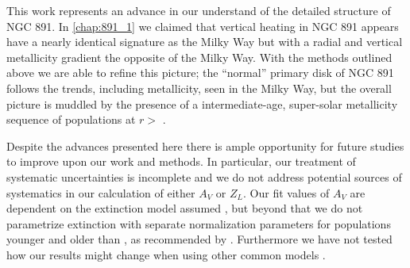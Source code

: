 
This work represents an advance in our understand of the detailed
structure of NGC 891. In \ref{chap:891_1} we claimed that
vertical heating in NGC 891 appears have a nearly identical signature
as the Milky Way but with a radial and vertical metallicity gradient
the opposite of the Milky Way. With the methods outlined above we are
able to refine this picture; the ``normal'' primary disk of NGC 891
follows the trends, including metallicity, seen in the Milky Way, but
the overall picture is muddled by the presence of a intermediate-age,
super-solar metallicity sequence of populations at $r >$
. 


Despite the advances presented here there is ample opportunity for
future studies to improve upon our work and methods. In particular,
our treatment of systematic uncertainties is incomplete and we do not
address potential sources of systematics in our calculation of either
$A_V$ or $Z_L$. Our fit values of $A_V$ are dependent on the
extinction model assumed \citep[i.e.,][]{Charlot00}, but beyond that
we do not parametrize extinction with separate normalization
parameters for populations younger and older than ,
as recommended by \citet{Charlot00}. Furthermore we have not tested
how our results might change when using other common models
\citep[e.g.,][]{Calzetti94}.

